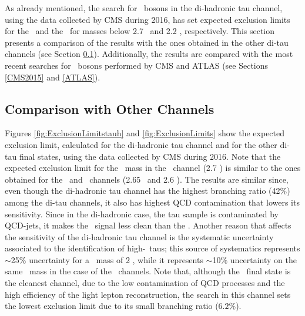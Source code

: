 \noindent As already mentioned, the search for \Zprime~bosons in the di-hadronic 
tau channel, using the data collected by CMS during 2016, has set 
expected exclusion limits for the \ZprimeSSM~and the \ZprimeTAT~for masses 
below 2.7 \TeV~and 2.2 \TeV, respectively. This section presents 
a comparison of the results with the ones obtained in the other 
di-tau channels (see Section \ref{CMS2016}). Additionally, the results are 
compared with the most recent searches for \Zprime~bosons performed by CMS and 
ATLAS (see Sections \ref{CMS2015} and \ref{ATLAS}). 

\subsection{Comparison with Other Channels}
\label{CMS2016}

Figures \ref{fig:ExclusionLimitstauh} and \ref{fig:ExclusionLimits} show the 
expected exclusion limit, calculated for the di-hadronic tau channel and for 
the other di-tau final states, using the data collected by CMS during 2016. Note that 
the expected exclusion limit for the \ZprimeSSM~mass 
in the \tauh\tauh~channel (2.7 \TeV) is similar to the ones obtained for the 
\tauh\taumu~and \tauh\taue~channels (2.65 \TeV~and 2.6 \TeV). The results are 
similar since, even though the di-hadronic tau channel has the highest 
branching ratio (42$\%$) among the di-tau channels, it also has 
highest QCD contamination that lowers its sensitivity. Since in the di-hadronic case, 
the tau sample is contaminated by QCD-jets, it makes the \tauh\tauh~signal less clean 
than the \tauh\tauell. Another reason that affects the 
sensitivity of the di-hadronic tau channel is the systematic uncertainty 
associated to the identification of high-\pt~taus; this 
source of systematics represents $\sim$25$\%$ uncertainty for a \Zprime~mass of 2 \TeV, while 
it represents $\sim$10$\%$ uncertainty on the same \Zprime~mass
in the case of the \tauh\tauell~channels. Note that, although the \taue\taumu~final 
state is the cleanest channel, due to the low contamination of QCD processes
and the high efficiency of the light lepton reconstruction, the search in this channel sets
the lowest exclusion limit due to its small branching ratio ($6.2\%$). 



